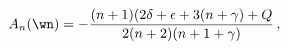 \begin{equation}
A_n(\wn) = - {(n+1)(2\delta +\epsilon + 3(n+\gamma ) 
+ Q\over 2(n+2)(n+1+\gamma)}\,,
\label{adef}
\end{equation}


